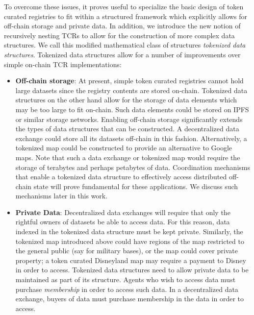 \documentclass{llncs}
\begin{document}
To overcome these issues, it proves useful to specialize the basic design of token curated registries to fit within a structured framework which explicitly allows for off-chain storage and private data. In addition, we introduce the new notion of recursively nesting TCRs to allow for the construction of more complex data structures. We call this modified mathematical class of structures \textit{tokenized data structures}. Tokenized data structures allow for a number of improvements over simple on-chain TCR implementations:


\begin{itemize}
\item \textbf{Off-chain storage}: At present, simple token curated registries cannot hold large datasets since the registry contents are stored on-chain. Tokenized data structures on the other hand allow for the storage of data elements which may be too large to fit on-chain. Such data elements could be stored on IPFS \cite{benet2014ipfs} or similar storage networks. Enabling off-chain storage significantly extends the types of data structures that can be constructed. A decentralized data exchange could store all its datasets off-chain in this fashion. Alternatively, a tokenized map could be constructed to provide an alternative to Google maps. Note that such a data exchange or tokenized map would require the storage of terabytes and perhaps petabytes of data. Coordination mechanisms that enable a tokenized data structure to effectively access distributed off-chain state will prove fundamental for these applications. We discuss such mechanisms later in this work.
\item \textbf{Private Data}: Decentralized data exchanges will require that only the rightful owners of datasets be able to access data. For this reason, data indexed in the tokenized data structure must be kept private. Similarly, the tokenized map introduced above could have regions of the map restricted to the general public (say for military bases), or the map could cover private property; a token curated Disneyland map may require a payment to Disney in order to access. Tokenized data structures need to allow private data to be maintained as part of its structure. Agents who wish to access data must purchase \textit{membership} in order to access such data. In a decentralized data exchange, buyers of data must purchase membership in the data in order to access.

\end{itemize}
\end{document}
